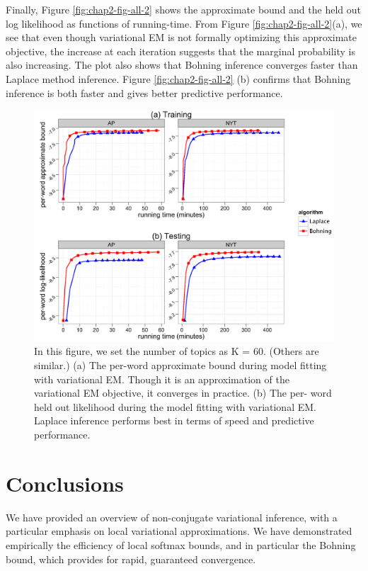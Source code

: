 Finally, Figure \ref{fig:chap2-fig-all-2} shows the approximate bound and the held out log likelihood as functions of running-time. From Figure \ref{fig:chap2-fig-all-2}(a), we see that even though variational EM is not formally optimizing this approximate objective, the increase at each iteration suggests that the marginal probability is also increasing. The plot also shows that Bohning inference converges faster than Laplace method inference. Figure \ref{fig:chap2-fig-all-2}  (b) confirms that Bohning inference is both faster and gives better predictive performance.



\begin{figure}
  \centering
    \hspace*{-1.5cm}\includegraphics[height=0.40\textheight]{./Chap2/plots/figs/fig2-all-2.png}
  \caption{In this figure, we set the number of topics as K = 60. (Others are similar.) (a) The per-word approximate bound during model fitting with variational EM. Though it is an approximation of the variational EM objective, it converges in practice. (b) The per- word held out likelihood during the model fitting with variational EM. Laplace inference performs best in terms of speed and predictive performance.}
  \label{fig:chap3-fig-all-2}
\end{figure}


\section{Conclusions}
We have provided an overview of non-conjugate variational inference, with a particular emphasis on local variational approximations. We have demonstrated empirically the efficiency of local softmax bounds, and in particular the Bohning bound, which provides for rapid, guaranteed convergence.

